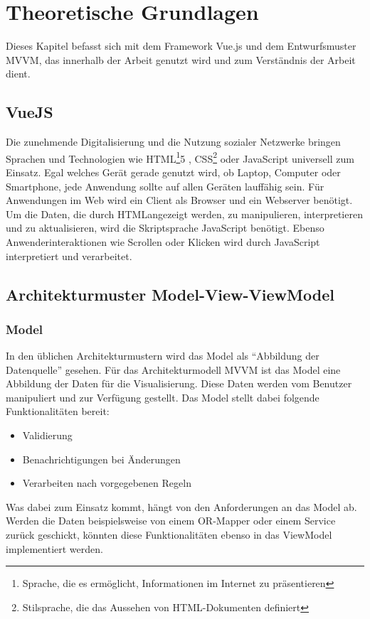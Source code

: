 \chapter{Theoretische Grundlagen}
Dieses Kapitel befasst sich mit dem Framework Vue.js und dem Entwurfsmuster \ac{MVVM}, das innerhalb der Arbeit genutzt wird und zum Verst\"andnis der Arbeit dient.
\section{VueJS}
Die zunehmende Digitalisierung und die Nutzung sozialer Netzwerke bringen Sprachen und Technologien wie \ac{HTML}\footnote{Sprache, die es erm\"oglicht, Informationen im Internet zu pr\"asentieren}5 , \ac{CSS}\footnote{Stilsprache, die das Aussehen von \ac{HTML}-Dokumenten definiert} oder JavaScript universell zum Einsatz. Egal welches Ger\"at gerade genutzt wird, ob Laptop, Computer oder Smartphone, jede Anwendung sollte auf allen Ger\"aten lauff\"ahig sein\cite{Teufel2018}.
F\"ur Anwendungen im Web wird ein Client als Browser und ein Webserver ben\"otigt. Um die Daten, die durch  \ac{HTML}angezeigt werden, zu manipulieren, interpretieren und zu aktualisieren, wird die Skriptsprache JavaScript ben\"otigt\cite{UniHagenWeb}. Ebenso Anwenderinteraktionen wie Scrollen oder Klicken wird durch JavaScript interpretiert und verarbeitet.




\section{Architekturmuster Model-View-ViewModel}

\subsection*{Model}
In  den \"ublichen Architekturmustern wird das Model als \enquote{Abbildung der Datenquelle} gesehen. F\"ur das  Architekturmodell \ac{MVVM} ist das Model eine Abbildung der Daten f\"ur die Visualisierung. Diese Daten werden vom Benutzer manipuliert und zur Verf\"ugung gestellt.
Das Model stellt dabei folgende Funktionalit\"aten bereit:
\begin{itemize}
\item Validierung
\item Benachrichtigungen bei \"Anderungen
\item Verarbeiten nach vorgegebenen Regeln
\end{itemize}
Was dabei zum Einsatz kommt, h\"angt von den Anforderungen an das Model ab. Werden die Daten beispielsweise von einem OR-Mapper oder einem Service zur\"uck geschickt, k\"onnten diese Funktionalit\"aten ebenso in das ViewModel implementiert werden\cite{EderModel2017}.

